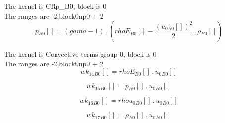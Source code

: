 \documentclass{article}
\begin{document}
\noindent The kernel is CRp_B0, block is 0\\\noindent The ranges are -2,block0np0 + 2\\\begin{dmath}{p{_{B0}}}[{}] = \left(gama - 1\right) \,.\, \left({rhoE{_{B0}}}[{}] - \frac{\left({u_{0}{_{B0}}}[{}] \right)^{2}}{2} \,.\, {\rho{_{B0}}}[{}]\right)\end{dmath}

\noindent The kernel is Convective terms group 0, block is 0\\\noindent The ranges are -2,block0np0 + 2\\\begin{dmath}{wk_{14}{_{B0}}}[{}] = {rhoE{_{B0}}}[{}] \,.\, {u_{0}{_{B0}}}[{}]\end{dmath}

\begin{dmath}{wk_{15}{_{B0}}}[{}] = {p{_{B0}}}[{}] \,.\, {u_{0}{_{B0}}}[{}]\end{dmath}

\begin{dmath}{wk_{16}{_{B0}}}[{}] = {rhou_{0}{_{B0}}}[{}] \,.\, {u_{0}{_{B0}}}[{}]\end{dmath}

\begin{dmath}{wk_{17}{_{B0}}}[{}] = {\rho{_{B0}}}[{}] \,.\, {u_{0}{_{B0}}}[{}]\end{dmath}
\end{document}
